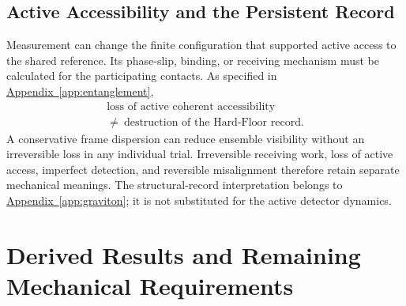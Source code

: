\subsection{Active Accessibility and the Persistent Record}
\label{sec:entanglement_decoherence}

Measurement can change the finite configuration that supported active access to the shared reference. Its phase-slip, binding, or receiving mechanism must be calculated for the participating contacts. As specified in \hyperref[app:entanglement]{Appendix~\ref*{app:entanglement}},
\begin{equation}
    \boxed{
    \begin{gathered}
    \text{loss of active coherent accessibility}\\
    \neq\ \text{destruction of the Hard-Floor record}.
    \end{gathered}
    }
    \label{eq:entanglement_decoherence_not_erasure}
\end{equation}
A conservative frame dispersion can reduce ensemble visibility without an irreversible loss in any individual trial. Irreversible receiving work, loss of active access, imperfect detection, and reversible misalignment therefore retain separate mechanical meanings. The structural-record interpretation belongs to \hyperref[app:graviton]{Appendix~\ref*{app:graviton}}; it is not substituted for the active detector dynamics.

\section{Derived Results and Remaining Mechanical Requirements}
\label{sec:entanglement_status}

